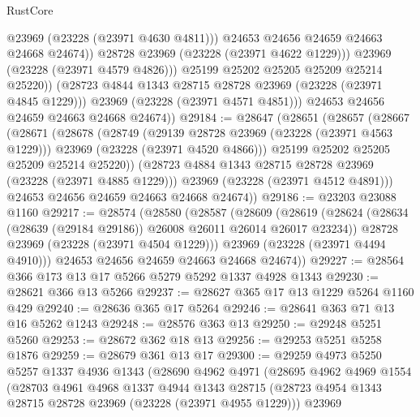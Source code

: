 \begin{lexlean}{RustCore}
\begin{coremodule}
                        @23969
                        (@23228 (@23971 @4630 @4811)))
                      @24653
                      @24656
                      @24659
                      @24663
                      @24668
                      @24674))
                  @28728
                  @23969
                  (@23228 (@23971 @4622 @1229)))
                @23969
                (@23228 (@23971 @4579 @4826)))
              @25199
              @25202
              @25205
              @25209
              @25214
              @25220))
          (@28723 @4844 @1343 @28715 @28728 @23969 (@23228 (@23971 @4845 @1229)))
          @23969
          (@23228 (@23971 @4571 @4851)))
        @24653
        @24656
        @24659
        @24663
        @24668
        @24674))
@29184 := @28647
    (@28651
      (@28657
        (@28667
          (@28671
            (@28678
              (@28749
                (@29139 @28728 @23969 (@23228 (@23971 @4563 @1229)))
                @23969
                (@23228 (@23971 @4520 @4866)))
              @25199
              @25202
              @25205
              @25209
              @25214
              @25220))
          (@28723 @4884 @1343 @28715 @28728 @23969 (@23228 (@23971 @4885 @1229)))
          @23969
          (@23228 (@23971 @4512 @4891)))
        @24653
        @24656
        @24659
        @24663
        @24668
        @24674))
@29186 := @23203 @23088 @1160
@29217 := @28574
    (@28580
      (@28587
        (@28609
          (@28619
            (@28624 (@28634 (@28639 (@29184 @29186)) @26008 @26011 @26014 @26017 @23234))
            @28728
            @23969
            (@23228 (@23971 @4504 @1229)))
          @23969
          (@23228 (@23971 @4494 @4910)))
        @24653
        @24656
        @24659
        @24663
        @24668
        @24674))
@29227 := @28564 @366 @173 @13 @17 @5266 @5279 @5292 @1337 @4928 @1343
@29230 := @28621 @366 @13 @5266
@29237 := @28627 @365 @17 @13 @1229 @5264 @1160 @429
@29240 := @28636 @365 @17 @5264
@29246 := @28641 @363 @71 @13 @16 @5262 @1243
@29248 := @28576 @363 @13
@29250 := @29248 @5251 @5260
@29253 := @28672 @362 @18 @13
@29256 := @29253 @5251 @5258 @1876
@29259 := @28679 @361 @13 @17
@29300 := @29259
    @4973
    @5250
    @5257
    @1337
    @4936
    @1343
    (@28690
      @4962
      @4971
      (@28695
        @4962
        @4969
        @1554
        (@28703
          @4961
          @4968
          @1337
          @4944
          @1343
          @28715
          (@28723 @4954 @1343 @28715 @28728 @23969 (@23228 (@23971 @4955 @1229)))
          @23969

\end{coremodule}
\end{lexlean}
